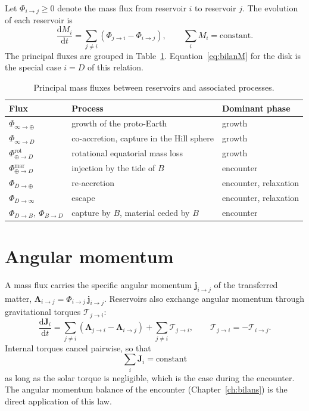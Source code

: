 \documentclass[11pt,a4paper,openany]{report}
\newcommand{\dd}{\mathrm{d}}
\begin{document}
Let $\Phi_{i\to j}\ge0$ denote the mass flux from reservoir $i$ to reservoir $j$. The evolution of
each reservoir is
\begin{equation}
\frac{\dd M_i}{\dd t}=\sum_{j\neq i}\left(\Phi_{j\to i}-\Phi_{i\to j}\right),
\qquad
\sum_i M_i=\text{constant}.
\label{eq:flux-masse}
\end{equation}
The principal fluxes are grouped in Table~\ref{tab:flux}. Equation~\eqref{eq:bilanM} for the disk
is the special case $i=D$ of this relation.

\begin{table}[htbp]
\centering
\small
\caption{Principal mass fluxes between reservoirs and associated processes.}
\label{tab:flux}
\begin{tabular}{lll}
\toprule
\textbf{Flux} & \textbf{Process} & \textbf{Dominant phase} \\
\midrule
$\Phi_{\infty\to\oplus}$ & growth of the proto-Earth & growth \\
$\Phi_{\infty\to D}$ & co-accretion, capture in the Hill sphere & growth \\
$\Phi_{\oplus\to D}^{\mathrm{rot}}$ & rotational equatorial mass loss & growth \\
$\Phi_{\oplus\to D}^{\mathrm{mar}}$ & injection by the tide of $B$ & encounter \\
$\Phi_{D\to\oplus}$ & re-accretion & encounter, relaxation \\
$\Phi_{D\to\infty}$ & escape & encounter, relaxation \\
$\Phi_{D\to B},\ \Phi_{B\to D}$ & capture by $B$, material ceded by $B$ & encounter \\
\bottomrule
\end{tabular}
\end{table}

\section{Angular momentum}

A mass flux carries the specific angular momentum $\mathbf{j}_{i\to j}$ of the transferred matter,
$\boldsymbol{\Lambda}_{i\to j}=\Phi_{i\to j}\,\mathbf{j}_{i\to j}$. Reservoirs also exchange angular
momentum through gravitational torques $\boldsymbol{\mathcal{T}}_{j\to i}$:
\begin{equation}
\frac{\dd\mathbf{J}_i}{\dd t}=\sum_{j\neq i}\left(\boldsymbol{\Lambda}_{j\to i}-\boldsymbol{\Lambda}_{i\to j}\right)
+\sum_{j\neq i}\boldsymbol{\mathcal{T}}_{j\to i},
\qquad
\boldsymbol{\mathcal{T}}_{j\to i}=-\boldsymbol{\mathcal{T}}_{i\to j}.
\label{eq:flux-J}
\end{equation}
Internal torques cancel pairwise, so that
\begin{equation}
\boxed{\;\sum_i\mathbf{J}_i=\text{constant}\;}
\label{eq:conservation-J}
\end{equation}
as long as the solar torque is negligible, which is the case during the encounter. The angular
momentum balance of the encounter (Chapter~\ref{ch:bilans}) is the direct application of this law.
\end{document}
